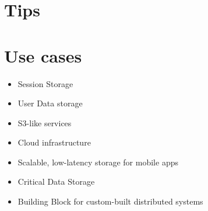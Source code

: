 \section{Tips}

\section{Use cases}

\begin{itemize}
  \item Session Storage
  \item User Data storage
  \item S3-like services
  \item Cloud infrastructure
  \item Scalable, low-latency storage for mobile apps
  \item Critical Data Storage
  \item Building Block for custom-built distributed systems
\end{itemize}